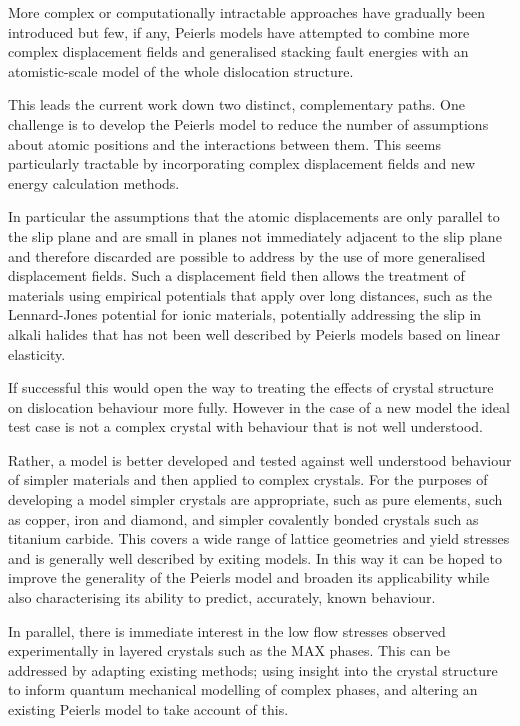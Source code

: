 More complex or computationally intractable approaches have gradually been introduced but few, if any, Peierls models have attempted to combine more complex displacement fields and generalised stacking fault energies with an atomistic-scale model of the whole dislocation structure. 

This leads the current work down two distinct, complementary paths. One challenge is to develop the Peierls model to reduce the number of assumptions about atomic positions and the interactions between them. This seems particularly tractable by incorporating complex displacement fields and new energy calculation methods. 

In particular the assumptions that the atomic displacements are only parallel to the slip plane and are small in planes not immediately adjacent to the slip plane and therefore discarded are possible to address by the use of more generalised displacement fields. Such a displacement field then allows the treatment of materials using empirical potentials that apply over long distances, such as the Lennard-Jones potential for ionic materials, potentially addressing the slip in alkali halides that has not been well described by Peierls models based on linear elasticity.

If successful this would open the way to treating the effects of crystal structure on dislocation behaviour more fully. However in the case of a new model the ideal test case is not a complex crystal with behaviour that is not well understood. 

Rather, a model is better developed and tested against well understood behaviour of simpler materials and then applied to complex crystals. For the purposes of developing a model simpler crystals are appropriate, such as pure elements, such as copper, iron and diamond, and simpler covalently bonded crystals such as titanium carbide. This covers a wide range of lattice geometries and yield stresses and is generally well described by exiting models. In this way it can be hoped to improve the generality of the Peierls model and broaden its applicability while also characterising its ability to predict, accurately, known behaviour.

In parallel, there is immediate interest in the low flow stresses observed experimentally in layered crystals such as the MAX phases. This can be addressed by adapting existing methods; using insight into the crystal structure to inform quantum mechanical modelling of complex phases, and altering an existing Peierls model to take account of this.


                      






















